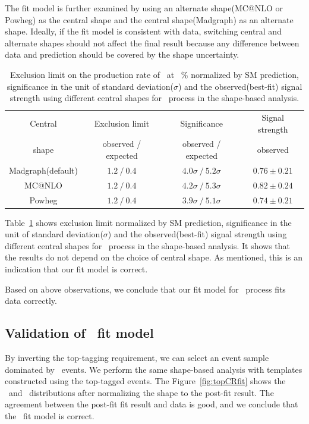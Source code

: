 The fit model is further examined by using an alternate shape(MC@NLO or Powheg) 
as the central shape and the central shape(Madgraph) as an alternate shape.   
Ideally, if the fit model is consistent with data, switching central and 
alternate shapes should not affect the final result because any difference 
between data and prediction should be covered by the shape uncertainty. 
%
\begin{table}[htp] 
\begin{center} 
\small
\vspace{0.5cm}
\caption{Exclusion limit on the production rate of \hww\ at ~\%
normalized by SM prediction, 
significance in the unit of standard deviation($\sigma$) 
and the observed(best-fit) signal strength using different 
central shapes for \qqww\ process in the shape-based analysis. } 
\vspace{0.5cm}
\label{tab:diffqqwwshape} 
\begin{tabular}{c|ccc} 
\hline 
Central & Exclusion limit & Significance & Signal strength  \\ 
shape & observed / expected  & observed / expected & observed \\ 
\hline 
\hline 
Madgraph(default) & $1.2~/~0.4$ & $4.0\sigma~/~5.2\sigma$ & $0.76\pm0.21$ \\
MC@NLO            & $1.2~/~0.4$ & $4.2\sigma~/~5.3\sigma$ & $0.82\pm0.24$ \\
Powheg            & $1.2~/~0.4$ & $3.9\sigma~/~5.1\sigma$ & $0.74\pm0.21$ \\
\hline 
\end{tabular} 
\end{center} 
\end{table} 
%
Table~\ref{tab:diffqqwwshape} shows exclusion limit normalized by SM prediction, 
significance in the unit of standard deviation($\sigma$) 
and the observed(best-fit) signal strength using different 
central shapes for \qqww\ process in the shape-based analysis.
It shows that the results do not depend on the choice of central shape.   
As mentioned, this is an indication that our fit model is correct. 

Based on above observations, we conclude that our fit model for \qqww\ process fits data correctly.  

\subsection{Validation of \topbkg\ fit model} 

By inverting the top-tagging requirement, we can select an event sample 
dominated by \topbkg\ events. We perform the same shape-based analysis 
with templates constructed using the top-tagged events. 
The Figure~\ref{fig:topCRfit} shows the \mll\ and \mT\ distributions 
after normalizing the shape to the post-fit result. The agreement 
between the post-fit fit result and data is good, and we conclude 
that the \topbkg\ fit model is correct. 

